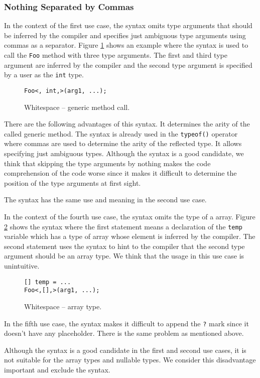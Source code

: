 \subsubsection{Nothing Separated by Commas} 

In the context of the first use case, the syntax omits type arguments that should be inferred by the compiler and specifies just ambiguous type arguments using commas as a separator. 
Figure \ref{img45:opW1} shows an example where the syntax is used to call the \texttt{Foo} method with three type arguments. 
The first and third type argument are inferred by the compiler and the second type argument is specified by a user as the \texttt{int} type.
\begin{figure}[h!]
\begin{lstlisting}[style=csharp]
Foo<, int,>(arg1, ...);
\end{lstlisting}
\caption{Whitespace -- generic method call.}
\label{img45:opW1}
\end{figure}
There are the following advantages of this syntax. 
It determines the arity of the called generic method. 
The syntax is already used in the \texttt{typeof()} operator where commas are used to determine the arity of the reflected type. 
It allows specifying just ambiguous types. 
Although the syntax is a good candidate, we think that skipping the type arguments by nothing makes the code comprehension of the code worse since it makes it difficult to determine the position of the type arguments at first sight.
\par
The syntax has the same use and meaning in the second use case.
\par
In the context of the fourth use case, the syntax omits the type of a array. 
Figure \ref{img46:opW4} shows the syntax where the first statement means a declaration of the \texttt{temp} variable which has a type of array whose element is inferred by the compiler. 
The second statement uses the syntax to hint to the compiler that the second type argument should be an array type.
We think that the usage in this use case is unintuitive.
\begin{figure}[h!]
\begin{lstlisting}[style=csharp]
[] temp = ...
Foo<,[],>(arg1, ...);
\end{lstlisting}
\caption{Whitespace -- array type.}
\label{img46:opW4}
\end{figure}
\par
In the fifth use case, the syntax makes it difficult to append the \texttt{?} mark since it doesn't have any placeholder.
There is the same problem as mentioned above.
\par
Although the syntax is a good candidate in the first and second use cases, it is not suitable for the array types and nullable types.
We consider this disadvantage important and exclude the syntax.

